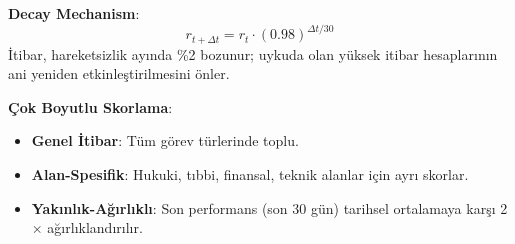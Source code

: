 \documentclass[11pt]{article}
\begin{document}
\textbf{Decay Mechanism}:
\begin{equation}
r_{t+\Delta t} = r_t \cdot (0.98)^{\Delta t / 30}
\end{equation}
İtibar, hareketsizlik ayında \%2 bozunur; uykuda olan yüksek itibar hesaplarının ani yeniden etkinleştirilmesini önler.

\textbf{Çok Boyutlu Skorlama}:
\begin{itemize}[noitemsep]
  \item \textbf{Genel İtibar}: Tüm görev türlerinde toplu.
  \item \textbf{Alan-Spesifik}: Hukuki, tıbbi, finansal, teknik alanlar için ayrı skorlar.
  \item \textbf{Yakınlık-Ağırlıklı}: Son performans (son 30 gün) tarihsel ortalamaya karşı 2$\times$ ağırlıklandırılır.
\end{itemize}
\end{document}
